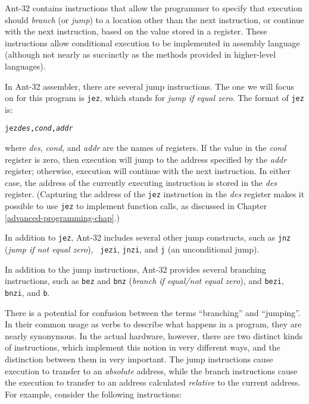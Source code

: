 Ant-32 contains instructions that allow the programmer to
specify that execution should {\em branch} (or {\em jump}) to a
location other than the next instruction, or continue with the next
instruction, based on the value stored in a register.  These
instructions allow conditional execution to be implemented in assembly
language (although not nearly as succinctly as the methods provided in
higher-level languages).


In Ant-32 assembler, there are several jump instructions.  The
one we will focus on for this program is {\tt jez}, which stands for
{\em jump if equal zero}.  The format of {\tt jez} is:

\begin{alltt}
                jez     {\em des}, {\em cond}, {\em addr} \end{alltt}

where {\em des}, {\em cond}, and {\em addr} are the names of
registers.  If the value in the {\em cond} register is zero, then
execution will jump to the address specified by the {\em addr}
register; otherwise, execution will continue with the next
instruction.  In either case, the address of the currently executing
instruction is stored in the {\em des} register.  (Capturing the
address of the {\tt jez} instruction in the {\em des} register makes
it possible to use {\tt jez} to implement function calls, as discussed
in Chapter \ref{advanced-programming-chap}.)

In addition to {\tt jez}, Ant-32 includes several other jump
constructs, such as {\tt jnz} ({\em jump if not equal zero}), {\tt
jezi}, {\tt jnzi}, and {\tt j} (an unconditional jump).

In addition to the jump instructions, Ant-32 provides several
branching instructions, such as {\tt bez} and {\tt bnz} ({\em branch
if equal/not equal zero}), and {\tt bezi}, {\tt bnzi}, and {\tt b}.

There is a potential for confusion between the terms ``branching'' and
``jumping''.  In their common usage as verbs to describe what happens
in a program, they are nearly synonymous.  In the actual hardware,
however, there are two distinct kinds of instructions, which implement
this notion in very different ways, and the distinction between them
in very important.  The jump instructions cause execution to transfer
to an {\em absolute} address, while the branch instructions cause the
execution to transfer to an address calculated {\em relative} to the
current address.  For example, consider the following instructions:

